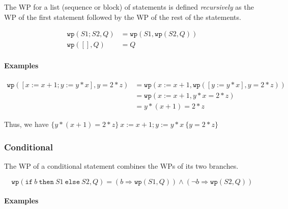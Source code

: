 \documentclass[oneside,11pt,dvipsnames]{book}
\renewcommand{\implies}{\Rightarrow}
\newcommand{\code}[1]{\texttt{#1}}
\begin{document}
The WP for a list (sequence or block) of statements is defined \emph{recursively} as the WP of the first statement followed by the WP of the rest of the statements.  

\begin{align}\label{eq:wp-sequence}
    \code{wp}(S1; S2, Q) &= \code{wp}(S1, \code{wp}(S2, Q))\\
    \code{wp}([], Q) &= Q
\end{align}

%
\paragraph{Examples}

\begin{equation*}
\begin{split}
    \code{wp}([x:=x+1; y:=y*x], y=2*z) &= \code{wp}  (x:=x+1, \code{wp}([y:=y*x], y=2*z))\\
    &= \code{wp}(x:=x+1, y*x=2*z)\\
    &= y*(x+1)=2*z
\end{split}
\end{equation*}


Thus, we have $\{y*(x+1)=2*z\} ~ x:=x+1; y:=y*x ~ \{y=2*z\}$

\subsubsection{Conditional}\label{conditional}

The WP of a conditional statement combines the WPs of its two branches.

\begin{equation}\label{eq:wp-conditional}
\code{wp}(\code{if}~b~\code{then}~S1~\code{else}~S2, Q)  =  (b \implies \code{wp}(S1,Q))  \land  (\neg b \implies \code{wp}(S2, Q))
\end{equation}

\paragraph{Examples}
\end{document}
